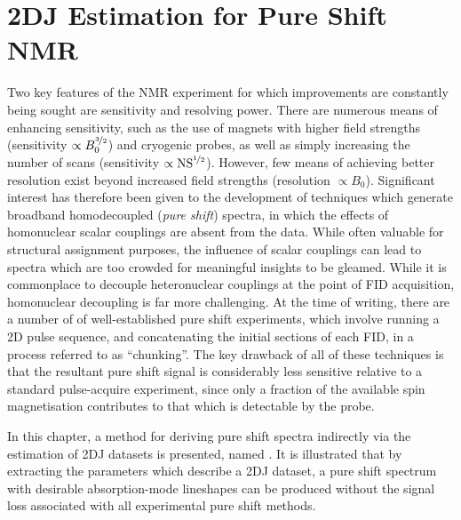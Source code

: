 \chapter{2DJ Estimation for Pure Shift NMR}
\label{chap:cupid}
Two key features of the \ac{NMR} experiment for which improvements are
constantly being sought are sensitivity and resolving power. There are numerous
means of enhancing sensitivity, such as the use of magnets with higher field
strengths\cite{Maeda2019} (sensitivity $\propto B_0^{\nicefrac{3}{2}}$) and
cryogenic probes\cite{Kovacs2020}, as well as simply
increasing the number of scans (sensitivity $\propto
\operatorname{NS}^{\nicefrac{1}{2}}$).
However, few means of achieving better resolution exist beyond increased field
strengths (resolution $\propto B_0$). Significant interest has therefore been
given to the development of techniques which generate broadband homodecoupled
(\emph{pure shift}) spectra, in which the effects of homonuclear scalar
couplings are absent from the data. While often valuable for structural
assignment purposes, the influence of scalar couplings can lead to spectra
which are too crowded for meaningful insights to be gleamed. While it is
commonplace to decouple heteronuclear couplings at the point of \ac{FID}
acquisition\cite{Shaka1983a, Shaka1983b,Shaka1985}, homonuclear decoupling is
far more challenging. At the time of writing, there are a number of of
well-established pure shift experiments, which involve running a \ac{2D} pulse
sequence, and concatenating the initial sections of each \ac{FID}, in a process
referred to as ``chunking''\cite{Meyer2013,Adams2014,Zangger2015}. The key
drawback of all of these techniques is that the resultant pure shift signal is
considerably less sensitive relative to a standard pulse-acquire experiment,
since only a fraction of the available spin magnetisation contributes to that
which is detectable by the probe.

In this chapter, a method for deriving pure shift spectra indirectly via the
estimation of \ac{2DJ} datasets is presented, named . It is
illustrated that by extracting the parameters which describe a \ac{2DJ}
dataset, a pure shift spectrum with desirable absorption-mode lineshapes can be
produced without the signal loss associated with all experimental pure shift
methods.





